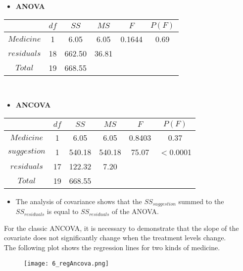 \begin{frame}
  \begin{itemize}
    \item \textbf{ANOVA}
  \end{itemize}
  \begin{center}
    \begin{tabular}{|c|c|c|c|c|c|}
      \hline
                  & $df$ & $SS$   & $MS$  & $F$    & $P(F)$ \\ \hline
      $Medicine$   & 1    & 6.05   & 6.05  & 0.1644 & 0.69   \\ \hline
      $residuals$ & 18   & 662.50 & 36.81 &        &        \\ \hline
      $Total$    & 19   & 668.55 &       &        &        \\ \hline
    \end{tabular}\\
  \end{center}
  \begin{itemize}
    \item \textbf{ANCOVA}
  \end{itemize}
  \begin{center}
    \begin{tabular}{|c|c|c|c|c|c|}
      \hline
                    & $df$ & $SS$   & $MS$   & $F$    & $P(F)$    \\ \hline
      $Medicine$     & 1    & 6.05   & 6.05   & 0.8403 & 0.37      \\ \hline
      $suggestion$ & 1    & 540.18 & 540.18 & 75.07  & $<$0.0001 \\ \hline
      $residuals$   & 17   & 122.32 & 7.20   &        &           \\ \hline
      $Total$      & 19   & 668.55 &        &        &           \\ \hline
    \end{tabular}
  \end{center}
  \begin{itemize}
    \item The analysis of covariance shows that the $ SS_{suggestion} $ summed to the $ SS_{residuals} $ is equal to $ SS_{residuals} $ of the ANOVA.
  \end{itemize}
\end{frame}

\begin{frame}
  \vspace*{0.25cm}
  For the classic ANCOVA, it is necessary to demonstrate that the slope of the covariate does not significantly change when the treatment levels change.\\
  The following plot shows the regression lines for two kinds of medicine. 
  \vspace*{.15cm}
  \begin{figure}
    \centering
    \texttt{[image: 6\_regAncova.png]}\\
  \end{figure}
\end{frame}

